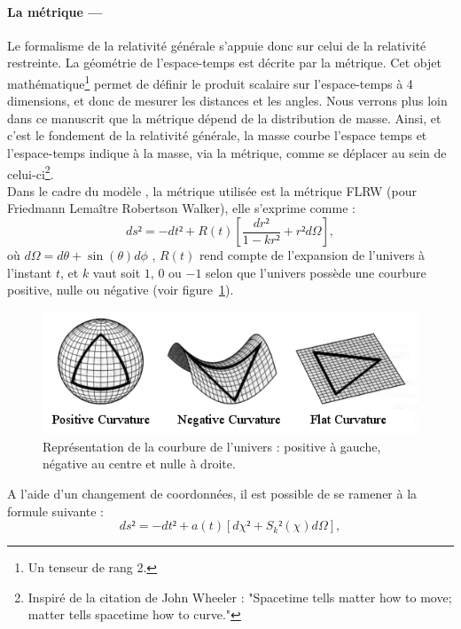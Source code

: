 \documentclass[11pt, twoside, a4paper, openright]{report}
\begin{document}
\paragraph{La métrique —}
Le formalisme de la relativité générale s'appuie donc sur celui de la relativité restreinte. La géométrie de l'espace-temps est décrite par la métrique. Cet objet mathématique\footnote{Un tenseur de rang 2.} permet de définir le produit scalaire sur l'espace-temps à 4 dimensions, et donc de mesurer les distances et les angles.
Nous verrons plus loin dans ce manuscrit que la métrique dépend de la distribution de masse. Ainsi, et c'est le fondement de la relativité générale, la masse courbe l'espace temps et l'espace-temps indique à la masse, via la métrique, comme se déplacer au sein de celui-ci\footnote{Inspiré de la citation de John Wheeler : "Spacetime tells matter how to move; matter tells spacetime how to curve."}. \\
Dans le cadre du modèle \lcdm{}, la métrique utilisée est la métrique FLRW (pour Friedmann Lemaître Robertson Walker), elle s'exprime comme :
\begin{equation}
  \label{eq:metrique1}
  ds² = - dt² + R(t) \left[ \frac{dr²}{1 - k r²} + r² d\Omega \right],
\end{equation}
où $d\Omega = d\theta + \sin(\theta) d\phi$ , $R(t)$ rend compte de l'expansion de l'univers à l'instant $t$, et $k$ vaut soit $1$, $0$ ou $-1$ selon que l'univers possède une courbure positive, nulle ou négative (voir figure~\ref{fig:curvature}).
\begin{figure}
  \centering
  \includegraphics[scale=0.6]{curvature}
  \caption{Représentation de la courbure de l'univers : positive à gauche, négative au centre et nulle à droite.}
  \label{fig:curvature}
\end{figure}
A l'aide d'un changement de coordonnées, il est possible de se ramener à la formule suivante :
\begin{equation}
  \label{eq:metrique2}
  ds² = - dt² + a(t)\left[ d\chi² + S_{k}²(\chi) d\Omega \right],
\end{equation}
\end{document}

